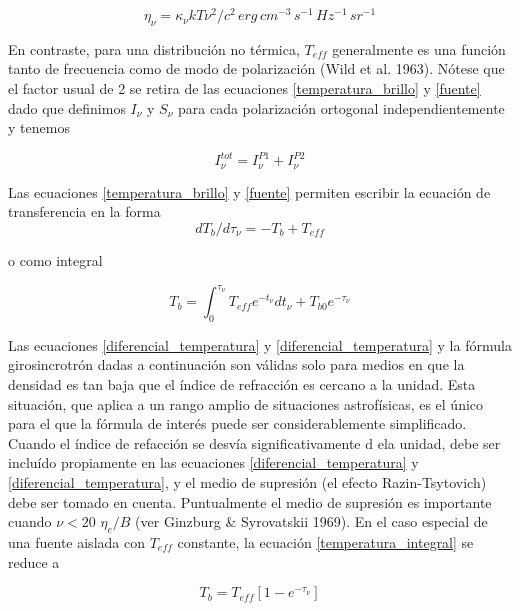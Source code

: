 \begin{equation} \label{eta_frecuencia}
\eta_\nu = \kappa_\nu k T \nu^2/c^2 \, erg \, cm^{-3} \,s^{-1} \,Hz^{-1}\, sr^{-1}
\end{equation}

En contraste, para una distribuci\'on no t\'ermica, $T_{eff}$ generalmente es una funci\'on tanto de frecuencia como de modo de polarizaci\'on (Wild et al. 1963). N\'otese que el factor usual de 2 se retira de las ecuaciones \ref{temperatura_brillo} y \ref{fuente} dado que definimos $I_\nu$ y $S_\nu$ para cada polarizaci\'on ortogonal independientemente y tenemos

\begin{equation} \label{intensidad_total}
I^{tot}_\nu = I^{P1}_\nu + I^{P2}_\nu
\end{equation}

Las ecuaciones \ref{temperatura_brillo} y \ref{fuente} permiten escribir la ecuaci\'on de transferencia en la forma
\begin{equation} \label{diferencial_temperatura}
dT_b/d\tau_\nu = -T_b + T_{eff}
\end{equation}

o como integral

\begin{equation} \label{temperatura_integral}
T_b = \int_{0}^{\tau_\nu} T_{eff} e^{-t_\nu} dt_\nu + T_{b0} e^{-\tau_\nu}
\end{equation}

Las ecuaciones \ref{diferencial_temperatura} y \ref{diferencial_temperatura} y la f\'ormula girosincrotr\'on dadas a continuaci\'on son v\'alidas solo para medios en que la densidad es tan baja que el \'indice de refracci\'on es cercano a la unidad. Esta situaci\'on, que aplica a un rango amplio de situaciones astrof\'isicas, es el \'unico para el que la f\'ormula de inter\'es puede ser considerablemente simplificado. Cuando el \'indice de refacci\'on se desv\'ia significativamente d ela unidad, debe ser inclu\'ido propiamente en las ecuaciones \ref{diferencial_temperatura} y \ref{diferencial_temperatura}, y el medio de supresi\'on (el efecto Razin-Tsytovich) debe ser tomado en cuenta. Puntualmente el medio de supresi\'on es importante cuando $\nu < 20$ $\eta_e/B$ (ver Ginzburg \& Syrovatskii 1969).
En el caso especial de una fuente aislada con $T_{eff}$ constante, la ecuaci\'on \ref{temperatura_integral} se reduce a

\begin{equation} \label{t_brillo1}
T_b = T_{eff}[1-e^{-\tau_\nu}]
\end{equation}

